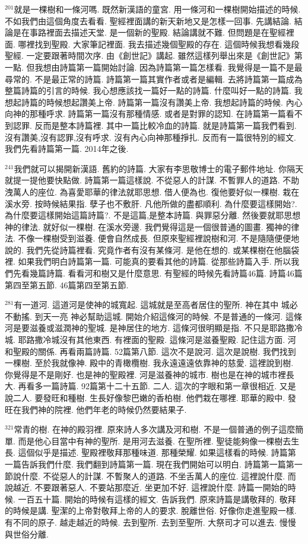 \documentclass{book}
\begin{document}
$^{201}$就是一棵樹和一條河嗎.
既然新漢語的童宮.
用一條河和一棵樹開始描述的時候.
不如我們由這個角度去看看.
聖經裡面講的新天新地又是怎樣一回事.
先講結論.
結論是在事路裡面去描述天堂.
是一個新的聖殿.
結論講就不難.
但問題是在聖經裡面.
哪裡找到聖殿.
大家筆記裡面.
我去描述幾個聖殿的存在.
這個時候我想看幾段聖經.
一定要跟著時間次序.
由《創世記》講起.
雖然這樣列舉出來是《創世記》第一點.
但我想由詩篇第一篇開始討論.
因為詩篇第一篇怎樣看.
我覺得是一篇不是最尋常的.
不是最正常的詩篇.
詩篇第一篇其實作者或者是編輯.
去將詩篇第一篇成為整篇詩篇的引言的時候.
我心想應該找一篇好一點的詩篇.
什麼叫好一點的詩篇.
我想起詩篇的時候想起讚美上帝.
詩篇第一篇沒有讚美上帝.
我想起詩篇的時候.
內心向神的那種呼求.
詩篇第一篇沒有那種情感.
或者是對罪的認知.
在詩篇第一篇看不到認罪.
反而是整本詩篇裡.
其中一篇比較冷血的詩篇.
就是詩篇第一篇我們看到.
沒有讚美,沒有認罪,沒有呼求.
沒有內心向神那種掙扎.
反而有一篇很特別的經文.
我們先看詩篇第一篇.
2014年之後.

$^{241}$我們就可以揭開新漢語.
舊約的詩篇.
大家有李思敬博士的電子郵件地址.
你隔天就提一提他要快點做.
詩篇第一篇這樣說.
不從惡人的計謀.
不暫罪人的道路.
不助洩萬人的座位.
為喜愛耶華的律法就耶思想.
借人便為也.
復他要好似一棵樹.
栽在溪水旁.
按時候結果指.
孽子也不敷肝.
凡他所做的盡都順利.
為什麼要這樣開始?.
為什麼要這樣開始這篇詩篇?.
不是這篇,是整本詩篇.
與罪惡分離.
然後要就耶思想神的律法.
就好似一棵樹.
在溪水旁邊.
我們覺得這是一個很普通的圖畫.
獨神的律法.
不像一棵樹受到滋養.
便會自然成長.
但原來聖經裡說樹和河.
不是隨隨便便地說的.
我們先從詩篇裡看.
究竟作者有沒有某條河.
是他在想的.
或某棵樹在他腦袋裡.
如果我們明白詩篇第一篇.
可能真的要看其他的詩篇.
從那些詩篇入手.
所以我們先看幾篇詩篇.
看看河和樹又是什麼意思.
有聖經的時候先看詩篇46篇.
詩篇46篇第四至第五節.
46篇第四至第五節.

$^{281}$有一道河.
這道河是使神的城寬起.
這城就是至高者居住的聖所.
神在其中 城必不動搖.
到天一亮 神必幫助這城.
開始介紹這條河的時候.
不是普通的一條河.
這條河是要滋養或滋潤神的聖城.
是神居住的地方.
這條河很明顯是指.
不只是耶路撒冷城.
耶路撒冷城沒有其他東西.
有裡面的聖殿.
這條河是滋養聖殿.
記住這方面.
河和聖殿的關係.
再看兩篇詩篇.
52篇第八節.
這次不是說河.
這次是說樹.
我們找到一棵樹.
至於我就像神.
殿中的青橄欖樹.
我永遠遠遠依靠神的慈愛.
這裡說到樹.
你覺得是不是剛好.
也是神的聖殿裡.
河是滋養神的城市.
樹也是在神的城市裡長大.
再看多一篇詩篇.
92篇第十二十五節.
二人.
這次的字眼和第一章很相近.
又是說二人.
要發旺和種樹.
生長好像黎巴嫩的香柏樹.
他們栽在哪裡.
耶華的殿中.
發旺在我們神的院裡.
他們年老的時候仍然要結果子.

$^{321}$常青的樹.
在神的殿羽裡.
原來詩人多次講及河和樹.
不是一個普通的例子這麼簡單.
而是他心目當中有神的聖所.
是用河去滋養.
在聖所裡.
聖徒能夠像一棵樹去生長.
這個似乎是描述.
聖殿裡敬拜那種味道.
那種榮耀.
如果這樣看的時候.
詩篇第一篇告訴我們什麼.
我們翻到詩篇第一篇.
現在我們開始可以明白.
詩篇第一篇第一節說什麼.
不從惡人的計謀.
不暫聚人的道路.
不坐舌萬人的座位.
這裡說什麼.
而說越近.
不要跟著惡人.
不要站那麼近.
坐更加不好.
這裡說什麼.
詩篇一開始的時候.
一百五十篇.
開始的時候有這樣的經文.
告訴我們.
原來詩篇是講敬拜的.
敬拜的時候是講.
聖潔的上帝對敬拜上帝的人的要求.
脫離世俗.
好像你走進聖殿一樣.
有不同的原子.
越走越近的時候.
去到聖所.
去到至聖所.
大祭司才可以進去.
慢慢與世俗分離.
\end{document}

